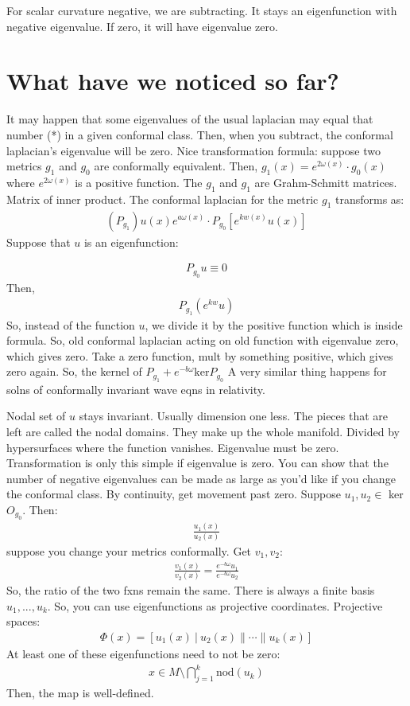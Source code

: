 \documentclass[11pt]{article}
\theoremstyle{definition}
\theoremstyle{definition}
\theoremstyle{definition}
\theoremstyle{remark}
\begin{document}
For scalar curvature negative, we are subtracting. It stays an eigenfunction with negative eigenvalue. If zero, it will have eigenvalue zero. 

\section{What have we noticed so far?}
It may happen that some eigenvalues of the usual laplacian may equal that number  (*) in a given conformal class. Then, when you subtract, the conformal laplacian's eigenvalue will be zero. Nice transformation formula: suppose two metrics $g_1$ and $g_0$ are conformally equivalent. Then, $g_1(x) = e^{2 \omega(x)} \cdot g_0(x)$ where $e^{2 \omega(x)}$ is a positive function. The $g_1$ and $g_1$ are Grahm-Schmitt matrices. Matrix of inner product. The conformal laplacian for the metric $g_1$ transforms as: 
\begin{align*}
	(P_{g_1}) u(x) e^{a \omega (x)} \cdot P_{g_{0}} \left[ e^{k w(x)} u(x) \right] 
\end{align*}
Suppose that $u$ is an eigenfunction: 

\begin{align*}
	P_{g_0}u \equiv 0 
\end{align*}
Then, 
\begin{align*}
	P_{g_1}( e^{kw}u) 
\end{align*}
So, instead of the function $u$, we divide it by the positive function which is inside formula. So, old conformal laplacian acting on old function with eigenvalue zero, which gives zero. Take a zero function, mult by something positive, which gives zero again. So, the kernel of $P_{g_1} + e^{-b \omega} \text{ker} P_{g_0}$ A very similar thing happens for solns of conformally invariant wave eqns in relativity. 

Nodal set of $u$ stays invariant. Usually dimension one less. The pieces that are left are called the nodal domains. They make up the whole manifold. Divided by hypersurfaces where the function vanishes. Eigenvalue must be zero. Transformation is only this simple if eigenvalue is zero. You can show that the number of negative eigenvalues can be made as large as you'd like if you change the conformal class. By continuity, get movement past zero. Suppose $u_1, u_2 \in $ ker$O_{g_0}$. Then: 
\begin{align*}
	\frac{u_1(x)}{u_2(x)}
\end{align*}
suppose you change your metrics conformally. Get $v_1, v_2$: 
\begin{align*}
	\frac{v_1(x)}{v_2(x)} = \frac{e^{-b\omega}u_1}{e^{-b \omega} u_2}
\end{align*}
So, the ratio of the two fxns remain the same. There is always a finite basis $u_1, ..., u_k$. So, you can use eigenfunctions as projective coordinates. Projective spaces: 
\begin{align}
	\Phi(x) = [u_1(x)\ |\ u_2(x) \| \cdots \| u_k(x) ]	
\end{align}
At least one of these eigenfunctions need to not be zero: 
\begin{align*}
	x \in M \setminus \bigcap_{j=1}^k \text{nod}(u_k)
\end{align*}
Then, the map is well-defined. 
\end{document}
